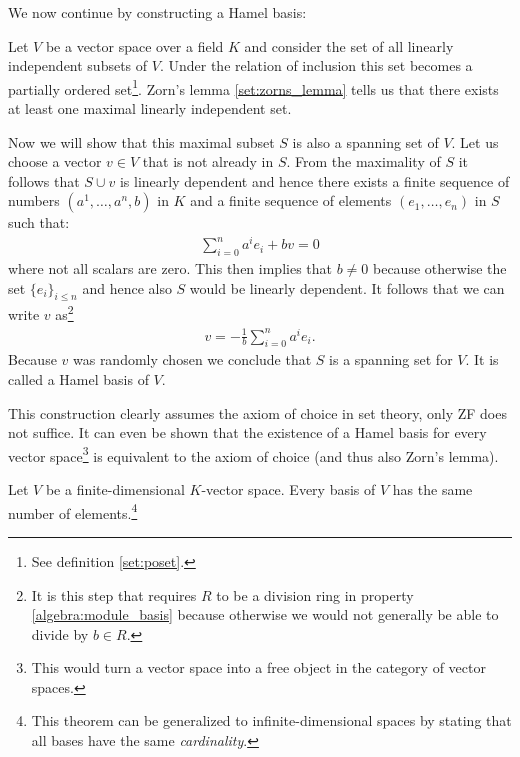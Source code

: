     We now continue by constructing a Hamel basis:
    \begin{construct}\label{linalgebra:hamel_basis}
        Let $V$ be a vector space over a field $K$ and consider the set of all linearly independent subsets of $V$. Under the relation of inclusion this set becomes a partially ordered set\footnote{See definition \ref{set:poset}.}. Zorn's lemma \ref{set:zorns_lemma} tells us that there exists at least one maximal linearly independent set.

        Now we will show that this maximal subset $S$ is also a spanning set of $V$. Let us choose a vector $v\in V$ that is not already in $S$. From the maximality of $S$ it follows that $S\cup v$ is linearly dependent and hence there exists a finite sequence of numbers $(a^1, \ldots, a^n, b)$ in $K$ and a finite sequence of elements $(e_1, \ldots, e_n)$ in $S$ such that:
        \begin{gather}
            \sum_{i=0}^n a^ie_i + bv = 0
        \end{gather}
        where not all scalars are zero. This then implies that $b\neq0$ because otherwise the set $\{e_i\}_{i\leq n}$ and hence also $S$ would be linearly dependent. It follows that we can write $v$ as\footnote{It is this step that requires $R$ to be a division ring in property \ref{algebra:module_basis} because otherwise we would not generally be able to divide by $b\in R$.}
        \begin{gather}
            v = -\frac{1}{b}\sum_{i=0}^na^ie_i.
        \end{gather}
        Because $v$ was randomly chosen we conclude that $S$ is a spanning set for $V$. It is called a Hamel basis of $V$.
    \end{construct}
    \begin{remark}
        This construction clearly assumes the axiom of choice in set theory, only ZF does not suffice. It can even be shown that the existence of a Hamel basis for every vector space\footnote{This would turn a vector space into a free object in the category of vector spaces.} is equivalent to the axiom of choice (and thus also Zorn's lemma).
    \end{remark}

    \begin{property}
        Let $V$ be a finite-dimensional $K$-vector space. Every basis of $V$ has the same number of elements.\footnote{This theorem can be generalized to infinite-dimensional spaces by stating that all bases have the same \textit{cardinality}.}
    \end{property}

